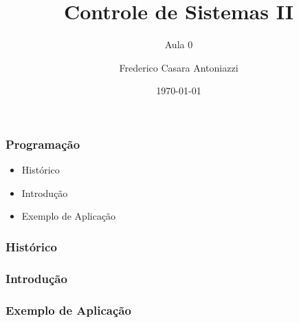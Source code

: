 \documentclass[12pt]{beamer}
\begin{document}
	\author{Frederico Casara Antoniazzi}
	\title{Controle de Sistemas II}
	\subtitle{Aula 0}
	\date{\today}
	
	\begin{frame}[plain]
		\maketitle
	\end{frame}
	
	\begin{frame}
		\frametitle{Programação}
		
		\begin{itemize}
			\item Histórico
			\item Introdução
			\item Exemplo de Aplicação
		\end{itemize}
		
	\end{frame}
	
	\begin{frame}
		\frametitle{Histórico}
	\end{frame}
	
	\begin{frame}
		\frametitle{Introdução}
	\end{frame}
	
	\begin{frame}
		\frametitle{Exemplo de Aplicação}
	\end{frame}
	
	\begin{frame}
		\frametitle{}
	\end{frame}
	
\end{document}
